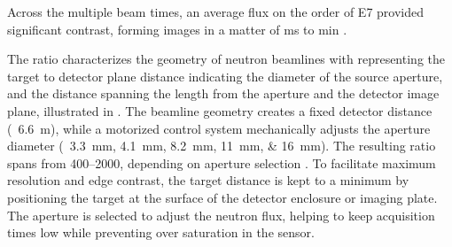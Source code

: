 \documentclass[../../../main.tex]{subfiles}%
\begin{document}
    Across the multiple beam times, an average flux on the order of \SI{E7}{\neutronflux} provided significant contrast, forming images in a matter of \si{\milli\second} to \si{\minute} \cite{Bilheux_2014}.
    \par%
    The  ratio characterizes the geometry of neutron \glspl{beamline} with  representing the target to detector plane distance  indicating the diameter of the source aperture, and the distance  spanning the length from the aperture and the detector image plane, illustrated in  \cite{ASTM:E748-16}.
    The \gls{beamline} geometry creates a fixed detector distance (\ \SI{6.6}{\meter}), while a motorized control system mechanically adjusts the aperture diameter (\ \SIlist[list-units=single]{3.3; 4.1; 8.2; 11; 16}{\milli\meter}).
    The resulting  ratio spans from \numrange{400}{2000}, depending on aperture selection \cite{Santodonato_2015}.
    To facilitate maximum resolution and edge contrast, the target distance  is kept to a minimum by positioning the target at the surface of the detector enclosure or imaging plate.
    The aperture is selected to adjust the neutron flux, helping to keep acquisition times low while preventing over saturation in the sensor.
\end{document}
